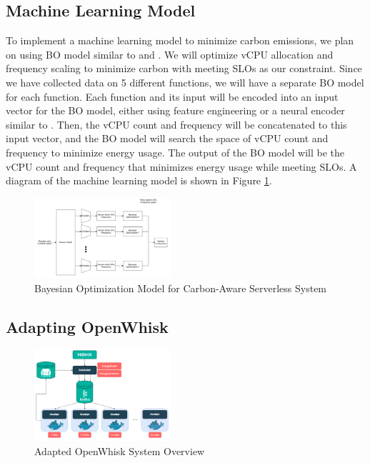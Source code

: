 \documentclass[times, 10pt,twocolumn]{article}
\begin{document}
\subsection{Machine Learning Model}
To implement a machine learning model to minimize carbon emissions, we plan on using BO model similar to \cite{CherryPick} and \cite{AQUATOPE}. We will optimize vCPU allocation and frequency scaling to minimize carbon with meeting SLOs as our constraint. Since we have collected data on 5 different functions, we will have a separate BO model for each function. Each function and its input will be encoded into an input vector for the BO model, either using feature engineering or a neural encoder similar to \cite{AQUATOPE}. Then, the vCPU count and frequency will be concatenated to this input vector, and the BO model will search the space of vCPU count and frequency to minimize energy usage. The output of the BO model will be the vCPU count and frequency that minimizes energy usage while meeting SLOs. A diagram of the machine learning model is shown in Figure \ref{fig:ml_model}.

\begin{figure}[ht]
   \centering
   \includegraphics[width=0.45\textwidth]{imgs/ml_model.png}
   \caption{Bayesian Optimization Model for Carbon-Aware Serverless System}
   \label{fig:ml_model}
 \end{figure}
\subsection{Adapting OpenWhisk}

\begin{figure}[ht]
   \centering
   \includegraphics[width=0.45\textwidth]{imgs/Adapted_OW_System_Overview.png}
   \caption{Adapted OpenWhisk System Overview}
   \label{fig:adapted_ow_system_overview}
 \end{figure}
\end{document}
